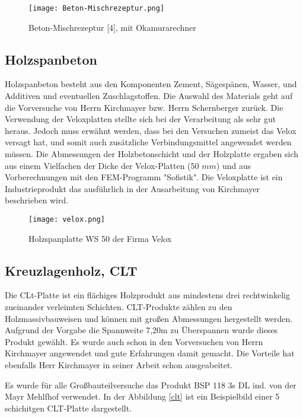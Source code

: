 \documentclass[12 pt,a4 paper ]{scrreprt}
\begin{document}
\begin{figure}[h]
\begin{center}
\texttt{[image: Beton-Mischrezeptur.png]}
\caption{Beton-Mischrezeptur [4], mit Okamurarechner}
\label{Beton-Mischrezeptur}
\end{center}
\end{figure}


\subsection{Holzspanbeton}

Holzspanbeton besteht aus den Komponenten Zement, Sägespänen, Wasser, und Additiven und eventuellen Zuschlagstoffen. Die Auswahl des Materials geht auf die Vorversuche von Herrn Kirchmayer bzw. Herrn Schernberger zurück. Die Verwendung der Veloxplatten stellte sich bei der Verarbeitung als sehr gut heraus. Jedoch muss erwähnt werden, dass bei den Versuchen zumeist das Velox versagt hat, und somit auch zusätzliche Verbindungsmittel angewendet werden müssen.
Die Abmessungen der Holzbetonschicht und der Holzplatte ergaben sich aus einem Vielfachen der Dicke der Velox-Platten (50 $mm$) und aus Vorberechnungen mit den FEM-Programm "Sofistik". Die Veloxplatte ist ein Industrieprodukt das ausführlich in der Ausarbeitung von Kirchmayer beschrieben wird.


\begin{figure}[h]
\begin{center}
\texttt{[image: velox.png]}
\caption{Holzspanplatte WS 50 der Firma Velox}
\label{velox}
\end{center}
\end{figure}

\subsection{Kreuzlagenholz, CLT}

Die CLt-Platte ist ein flächiges Holzprodukt aus mindestens drei rechtwinkelig zueinander verleimten Schichten. CLT-Produkte zählen zu den Holzmassivbauweisen und können mit großen Abmessungen hergestellt werden. Aufgrund der Vorgabe die Spannweite 7,20m zu Überspannen wurde dieses Produkt gewählt. Es wurde auch schon in den Vorversuchen von Herrn Kirchmayer angewendet und gute Erfahrungen damit gemacht. Die Vorteile hat ebenfalls Herr Kirchmayer in seiner Arbeit schon ausgeabeitet.

Es wurde für alle Großbauteilversuche das Produkt BSP 118 3s DL ind. von der Mayr Mehlfhof  verwendet. In der Abbildung \ref{clt} ist ein Beispielbild einer 5 schichitgen CLT-Platte dargestellt.
\end{document}
